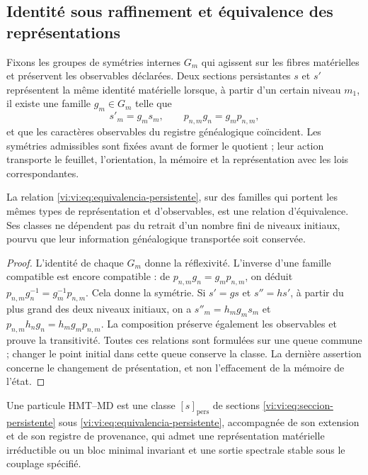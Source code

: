 \subsection{Identité sous raffinement et équivalence des représentations}
\label{vi:vi:subsec:identidad-material}

Fixons les groupes de symétries internes $G_m$ qui agissent sur les fibres
matérielles et préservent les observables déclarées. Deux sections
persistantes $s$ et $s'$ représentent la même identité matérielle lorsque,
à partir d’un certain niveau $m_1$, il existe une famille $g_m\in G_m$ telle que
\begin{equation}
 s'_m=g_ms_m,\qquad
 p_{n,m}g_n=g_mp_{n,m},
 \label{vi:vi:eq:equivalencia-persistente}
\end{equation}
et que les caractères observables du registre généalogique coïncident. Les
symétries admissibles sont fixées avant de former le quotient ; leur action
transporte le feuillet, l’orientation, la mémoire et la représentation avec
les lois correspondantes.

\begin{proposition}
\label{vi:vi:prop:equivalencia-persistente}
La relation \eqref{vi:vi:eq:equivalencia-persistente}, sur des familles qui
portent les mêmes types de représentation et d’observables, est une relation
d’équivalence. Ses classes ne dépendent pas du retrait d’un nombre
fini de niveaux initiaux, pourvu que leur information
généalogique transportée soit conservée.
\end{proposition}
\begin{proof}
L’identité de chaque $G_m$ donne la réflexivité. L’inverse d’une famille
compatible est encore compatible : de
$p_{n,m}g_n=g_mp_{n,m}$, on déduit
$p_{n,m}g_n^{-1}=g_m^{-1}p_{n,m}$. Cela donne la symétrie.
Si $s'=gs$ et $s''=hs'$, à partir du plus grand des deux niveaux initiaux,
on a $s''_m=h_mg_ms_m$ et
$p_{n,m}h_ng_n=h_mg_mp_{n,m}$. La composition préserve également les
observables et prouve la transitivité. Toutes ces relations sont formulées
sur une queue commune ; changer le point initial dans cette queue
conserve la classe. La dernière assertion concerne le changement de
présentation, et non l’effacement de la mémoire de l’état.
\end{proof}

\begin{definition}
\label{vi:vi:def:particula}
Une particule HMT--MD est une classe $[s]_{\mathrm{pers}}$ de sections
\eqref{vi:vi:eq:seccion-persistente} sous
\eqref{vi:vi:eq:equivalencia-persistente}, accompagnée de son extension et de son
registre de provenance, qui admet une représentation matérielle
irréductible ou un bloc minimal invariant et une sortie spectrale stable
sous le couplage spécifié.
\end{definition}

